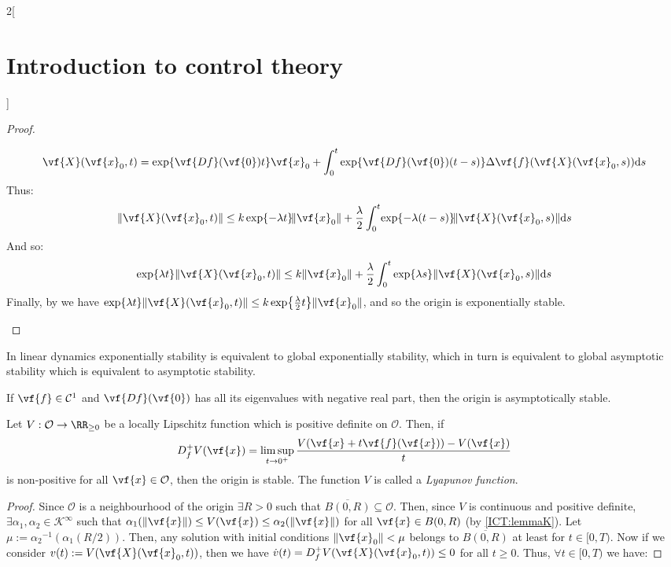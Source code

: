 \documentclass[../../../main_math.tex]{subfiles}
\begin{document}
\begin{multicols}{2}[\section{Introduction to control theory}]
\begin{proof}
\begin{enumerate}
            $$
              \vf{X}(\vf{x}_0,t)=\exp{\vf{Df}(\vf{0})t}\vf{x}_0+\int_0^t\exp{\vf{Df}(\vf{0})(t-s)}\Delta\vf{f}(\vf{X}(\vf{x}_0,s))\dd s
            $$
            Thus:
            $$
              \norm{\vf{X}(\vf{x}_0,t)}\leq k \exp{-\lambda t}\!\norm{\vf{x}_0}+\frac{\lambda}{2}\int_0^t\!\exp{-\lambda(t-s)}\!\norm{\vf{X}(\vf{x}_0,s)}\dd s
            $$
            And so:
            $$
              \exp{\lambda t}\norm{\vf{X}(\vf{x}_0,t)}\leq k \norm{\vf{x}_0}+\frac{\lambda}{2}\int_0^t\exp{\lambda s}\norm{\vf{X}(\vf{x}_0,s)}\dd s
            $$
            Finally, by  we have $\exp{\lambda t}\norm{\vf{X}(\vf{x}_0,t)}\leq k \exp{\frac{\lambda}{2} t}\norm{\vf{x}_0}$, and so the origin is exponentially stable.
    \end{enumerate}
  \end{proof}
  \begin{remark}
    In linear dynamics exponentially stability is equivalent to global exponentially stability, which in turn is equivalent to global asymptotic stability which is equivalent to asymptotic stability.
  \end{remark}
  \begin{corollary}
    If $\vf{f}\in\mathcal{C}^1$ and $\vf{Df}(\vf{0})$ has all its eigenvalues with negative real part, then the origin is asymptotically stable.
  \end{corollary}
  \begin{theorem}
    Let $V:\mathcal{O}\to \RR_{\geq 0}$ be a locally Lipschitz function which is positive definite on $\mathcal{O}$. Then, if
    $$
      D_f^+V(\vf{x}) = \limsup_{t\to 0^+}\frac{V(\vf{x} + t\vf{f}(\vf{x})) - V(\vf{x})}{t}
    $$
    is non-positive for all $\vf{x}\in \mathcal{O}$, then the origin is stable. The function $V$ is called a \emph{Lyapunov function}.
  \end{theorem}
  \begin{proof}
    Since $\mathcal{O}$ is a neighbourhood of the origin $\exists R>0$ such that $\overline{B(0,R)}\subseteq \mathcal{O}$. Then, since $V$ is continuous and positive definite, $\exists \alpha_1,\alpha_2\in\mathcal{K}^\infty$ such that $\alpha_1(\norm{\vf{x}})\leq V(\vf{x})\leq \alpha_2(\norm{\vf{x}})$ for all $\vf{x}\in B(0,R)$ (by \cref{ICT:lemmaK}). Let $\mu:={\alpha_2}^{-1}(\alpha_1(R/2))$. Then, any solution with initial conditions $\norm{\vf{x}_0}<\mu$ belongs to $\overline{B(0,R)}$ at least for $t\in[0, T)$. Now if we consider $v(t) := V(\vf{X}(\vf{x}_0, t))$, then we have $\dot{v}(t) = D_f^+V(\vf{X}(\vf{x}_0, t))\leq 0$ for all $t\geq 0$. Thus, $\forall t \in [0, T)$ we have:

\end{proof}
\end{multicols}
\end{document}
